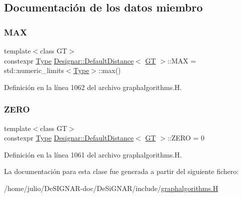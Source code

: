 \subsection{Documentación de los datos miembro}
\mbox{\label{class_designar_1_1_default_distance_af1c417705ee2d66f828c0f872607a7ea}} 
\subsubsection{\texorpdfstring{M\+AX}{MAX}}
{\footnotesize\ttfamily template$<$class GT$>$ \\
constexpr \hyperlink{class_designar_1_1_default_distance_a9317a5edf566779550b96edd532b502b}{Type} \hyperlink{class_designar_1_1_default_distance}{Designar\+::\+Default\+Distance}$<$ \hyperlink{demo-buildgraph_8_c_a3001c40d2c31ca87ed96cd7d1334a55e}{GT} $>$\+::M\+AX = std\+::numeric\+\_\+limits$<$\hyperlink{class_designar_1_1_default_distance_a9317a5edf566779550b96edd532b502b}{Type}$>$\+::max()\hspace{0.3cm}{\ttfamily [static]}}



Definición en la línea 1062 del archivo graphalgorithms.\+H.

\mbox{\label{class_designar_1_1_default_distance_abee3d9a2a3f573d6844c0a0fdbd4d7ac}} 
\subsubsection{\texorpdfstring{Z\+E\+RO}{ZERO}}
{\footnotesize\ttfamily template$<$class GT$>$ \\
constexpr \hyperlink{class_designar_1_1_default_distance_a9317a5edf566779550b96edd532b502b}{Type} \hyperlink{class_designar_1_1_default_distance}{Designar\+::\+Default\+Distance}$<$ \hyperlink{demo-buildgraph_8_c_a3001c40d2c31ca87ed96cd7d1334a55e}{GT} $>$\+::Z\+E\+RO = 0\hspace{0.3cm}{\ttfamily [static]}}



Definición en la línea 1061 del archivo graphalgorithms.\+H.



La documentación para esta clase fue generada a partir del siguiente fichero\+:\begin{DoxyCompactItemize}
\item 
/home/julio/\+De\+S\+I\+G\+N\+A\+R-\/doc/\+De\+Si\+G\+N\+A\+R/include/\hyperlink{graphalgorithms_8_h}{graphalgorithms.\+H}\end{DoxyCompactItemize}
